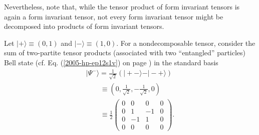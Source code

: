Nevertheless, note that, while the tensor product of form invariant tensors is again a form invariant tensor,  not every form
invariant tensor might be decomposed into products of form invariant tensors.

{
\color{blue}
\bexample
Let
$\vert + \rangle  \equiv   (0,1)$
and
$\vert - \rangle  \equiv   (1,0)$.
For a nondecomposable tensor, consider the sum of two-partite tensor products (associated with two ``entangled'' particles)
Bell state (cf. Eq. (\ref{2005-hp-ep12s1v}) on page \pageref{2005-hp-ep12s1v}) in the standard basis     
\begin{equation}
\begin{split}
\vert \Psi^-\rangle = \frac{1}{\sqrt{2}}\left(\vert +-\rangle   - \vert -+\rangle  \right)   \\
\qquad \equiv  \left( 0,\frac{1}{\sqrt{2}},- \frac{1}{\sqrt{2}} ,  0 \right)     \\
\qquad \equiv  \frac{1}{2}
\begin{pmatrix}
0&0&0&0\\
0&1&-1&0\\
0&-1&1&0\\
0&0&0&0
\end{pmatrix}
.
\end{split}
\label{2011-m-bellstatenondec}
\end{equation}

}
